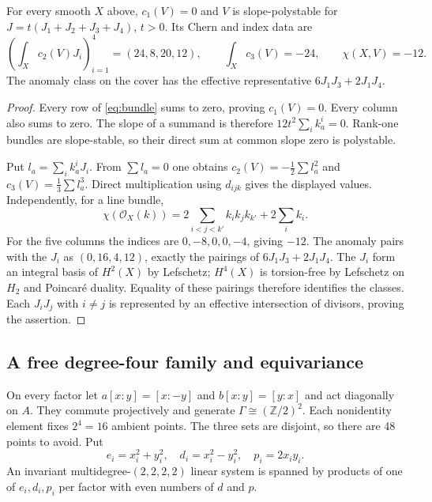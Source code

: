 \begin{proposition}\label{prop:cover}
For every smooth $X$ above, $c_1(V)=0$ and $V$ is slope-polystable for
$J=t(J_1+J_2+J_3+J_4)$, $t>0$. Its Chern and index data are
\[
 \left(\int_Xc_2(V)J_i\right)_{i=1}^4=(24,8,20,12),
 \qquad \int_Xc_3(V)=-24,\qquad\chi(X,V)=-12.
\]
The anomaly class on the cover has the effective representative
$6J_1J_3+2J_1J_4$.
\end{proposition}
\begin{proof}
Every row of \eqref{eq:bundle} sums to zero, proving $c_1(V)=0$.
Every column also sums to zero. The slope of a summand is therefore
$12t^2\sum_i k_a^i=0$. Rank-one bundles are slope-stable, so their
direct sum at common slope zero is polystable.

Put $l_a=\sum_i k_a^iJ_i$. From $\sum l_a=0$ one obtains
$c_2(V)=-\tfrac12\sum l_a^2$ and
$c_3(V)=\tfrac13\sum l_a^3$. Direct multiplication using $d_{ijk}$ gives
the displayed values. Independently, for a line bundle,
\[
 \chi(\mathcal O_X(k))=
 2\sum_{i<j<k'}k_i k_j k_{k'}+2\sum_i k_i.
\]
For the five columns the indices are $0,-8,0,0,-4$, giving $-12$.
The anomaly pairs with the $J_i$ as $(0,16,4,12)$, exactly the pairings
of $6J_1J_3+2J_1J_4$. The $J_i$ form an integral basis of $H^2(X)$ by
Lefschetz; $H^4(X)$ is torsion-free by Lefschetz on $H_2$ and Poincar\'e
duality. Equality of these pairings therefore identifies the classes.
Each $J_iJ_j$ with $i\ne j$ is represented by an effective intersection
of divisors, proving the assertion.
\end{proof}

\subsection{A free degree-four family and equivariance}
On every factor let $a[x:y]=[x:-y]$ and $b[x:y]=[y:x]$ and act
diagonally on $A$. They commute projectively and generate
$\Gamma\cong(\mathbb Z/2)^2$. Each nonidentity element fixes $2^4=16$
ambient points. The three sets are disjoint, so there are 48 points to
avoid. Put
\[
 e_i=x_i^2+y_i^2,\quad d_i=x_i^2-y_i^2,\quad p_i=2x_iy_i.
\]
An invariant multidegree-$(2,2,2,2)$ linear system is spanned by products
of one of $e_i,d_i,p_i$ per factor with even numbers of $d$ and $p$.

